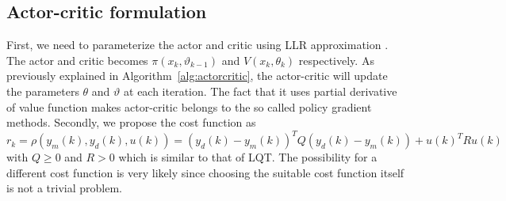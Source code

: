 \subsection{Actor-critic formulation}
First, we need to parameterize the actor and critic using \ac {LLR} approximation \cite{Grondman6096441}. The actor and critic becomes $\pi(x_k,\vartheta_{k-1})$ and $V(x_k,\theta_k)$ respectively. As previously explained in Algorithm~\ref{alg:actorcritic}, the actor-critic will update the parameters $\theta$ and $\vartheta$ at each iteration. The fact that it uses partial derivative of value function makes actor-critic belongs to the so called policy gradient methods. Secondly, we propose the cost function as
\begin{equation}
r_k = \rho(y_m(k), y_d(k), u(k)) = (y_d(k) - y_m(k))^TQ(y_d(k) - y_m(k)) + u(k)^TRu(k)
\end{equation}
with $ Q \geq 0 $ and $ R>0 $ which is similar to that of \acs {LQT}. The possibility for a different cost function is very likely since choosing the suitable cost function itself is not a trivial problem.



